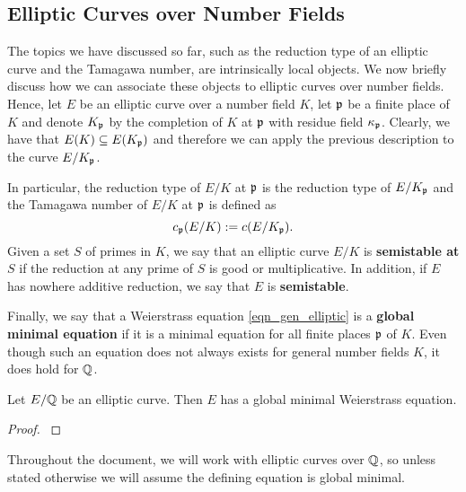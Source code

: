 
\subsection{Elliptic Curves over Number Fields}

The topics we have discussed so far, such as the reduction type of an elliptic curve and the Tamagawa number, are intrinsically local objects. We now briefly discuss how we can associate these objects to elliptic curves over number fields. Hence, let $E$ be an elliptic curve over a number field $K$, let $\mathfrak{p}$ be a finite place of $K$ and denote $K_{\mathfrak{p}}$ by the completion of $K$ at $\mathfrak{p}$ with residue field $\kappa_{\mathfrak{p}}$. Clearly, we have that $E(K)\subseteq E(K_{\mathfrak{p}})$ and therefore we can apply the previous description to the curve $E/K_{\mathfrak{p}}$.

In particular, the reduction type of $E/K$ at $\mathfrak{p}$ is the reduction type of $E/K_{\mathfrak{p}}$ and the Tamagawa number of $E/K$ at $\mathfrak{p}$ is defined as 
$$c_{\mathfrak{p}}(E/K):=c(E/K_{\mathfrak{p}}).$$
Given a set $S$ of primes in $K$, we say that an elliptic curve $E/K$ is \textbf{semistable at $S$}  if the reduction at any prime of $S$ is good or multiplicative. In addition, if $E$ has nowhere additive reduction, we say that $E$ is \textbf{semistable}.



Finally, we say that a Weierstrass equation \eqref{eqn_gen_elliptic} is a \textbf{global minimal equation} if it is a minimal equation for all finite places $\mathfrak{p}$ of $K$. Even though such an equation does not always exists for general number fields $K$, it does hold for $\mathbb{Q}$.

\begin{prop}\label{prop_globmin}
    Let $E/\mathbb{Q}$ be an elliptic curve. Then $E$ has a global minimal Weierstrass equation.
\end{prop}
\begin{proof}
    \cite[\S VIII, Corollary 8.3]{S1}
\end{proof}

Throughout the document, we will work with elliptic curves over $\mathbb{Q}$, so unless stated otherwise we will assume the defining equation is global minimal.